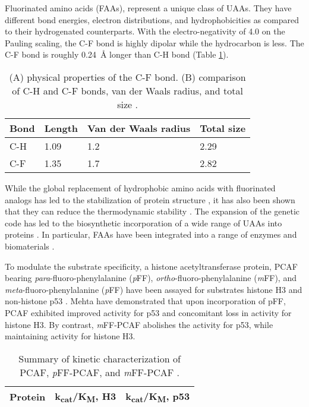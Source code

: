 \begin{refsection}
Fluorinated amino acids (FAAs), represent a unique class of UAAs. They have
different bond energies, electron distributions, and
hydrophobicities \cite{Biffinger2004} as compared to their hydrogenated
counterparts. With the electro-negativity of 4.0 on the Pauling scaling, the
C-F bond is highly dipolar while the hydrocarbon is less. The C-F bond is
roughly \SI{0.24}{\angstrom} longer than C-H bond (Table
\ref{tab:c-fbond})\cite{Tang2001}. 
\begin{table}[htbp]
\centering
\caption[(A) physical properties of the C-F bond. (B) comparison of C-H and C-F
bonds, van der Waals radius, and total size]{(A) physical properties of the C-F
bond. (B) comparison of C-H and C-F bonds, van der Waals radius, and total
size \cite{Tang2001,Odar2015}.}
\begin{tabular}{ llll }
  \hline
  Bond & Length & Van der Waals radius & Total size \\
  \hline

  C-H & 1.09 & 1.2 & 2.29 \\
  C-F & 1.35 & 1.7 & 2.82 \\

  \hline
\end{tabular}
\label{tab:c-fbond}
\end{table}

While the global replacement of hydrophobic amino acids with fluorinated
analogs has led to the stabilization of protein structure \cite{Biffinger2004},
it has also been shown that they can reduce the thermodynamic stability
\cite{Panchenko2006b}. The expansion of the genetic code has led to the
biosynthetic incorporation of a wide range of UAAs into proteins
\cite{Voloshchuk2010}. In particular, FAAs have been integrated into a range of
enzymes
\cite{Voloshchuk2009,Panchenko2006b,Voloshchuk2007b,Mehta2011a,Hammill2007} and
biomaterials \cite{Yuvienco2012b}. 

To modulate the substrate specificity, a histone acetyltransferase protein,
PCAF bearing \emph{para}-fluoro-phenylalanine (\emph{p}FF),
\emph{ortho}-fluoro-phenylalanine (\emph{m}FF), and
\emph{meta}-fluoro-phenylalanine (\emph{p}FF) have been assayed for substrates
histone H3 and non-histone p53 \cite{Mehta2011a}. Mehta  have
demonstrated that upon incorporation of pFF, PCAF exhibited improved activity
for p53 and concomitant loss in activity for histone H3. By contrast,
\emph{m}FF-PCAF abolishes the activity for p53, while maintaining activity for
histone H3. 
\begin{table}[htbp]
\centering
\caption[Summary of kinetic characterization of PCAF, \emph{p}FF-PCAF, and
\emph{m}FF-PCAF.]{Summary of kinetic characterization of PCAF, \emph{p}FF-PCAF,
and \emph{m}FF-PCAF \cite{Mehta2011a}.} \label{tab:PCAF}
\begin{tabular}{ lll }
  \hline
  Protein & k\textsubscript{cat}/K\textsubscript{M}, H3 &
  k\textsubscript{cat}/K\textsubscript{M}, p53 \\ \hline


\end{tabular}
\end{table}
\end{refsection}
